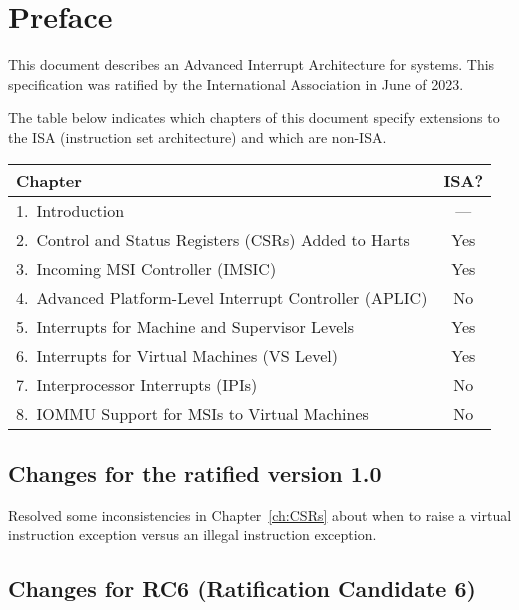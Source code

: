 
\chapter{Preface}

This document describes an Advanced Interrupt Architecture
for {\RISCV} systems.
This specification was ratified by the
{\RISCV} International Association in June of 2023.

The table below indicates which chapters
of this document specify extensions to the
{\RISCV} ISA (instruction set architecture) and which are non-ISA.

{
\begin{table}[hbt]
\centering
\begin{tabular}{|l|c|}
\hline
Chapter                                                  & ISA? \\
\hline
\hline
1.\ Introduction                                         & ---  \\
2.\ Control and Status Registers (CSRs) Added to Harts   & Yes  \\
3.\ Incoming MSI Controller (IMSIC)                      & Yes  \\
4.\ Advanced Platform-Level Interrupt Controller (APLIC) & No   \\
5.\ Interrupts for Machine and Supervisor Levels         & Yes  \\
6.\ Interrupts for Virtual Machines (VS Level)           & Yes  \\
7.\ Interprocessor Interrupts (IPIs)                     & No   \\
8.\ IOMMU Support for MSIs to Virtual Machines           & No   \\
\hline
\end{tabular}
\end{table}
}

\section*{Changes for the ratified version 1.0}

Resolved some inconsistencies in Chapter~\ref{ch:CSRs}
about when to raise a virtual instruction exception
versus an illegal instruction exception.

\section*{Changes for RC6 (Ratification Candidate 6)}

